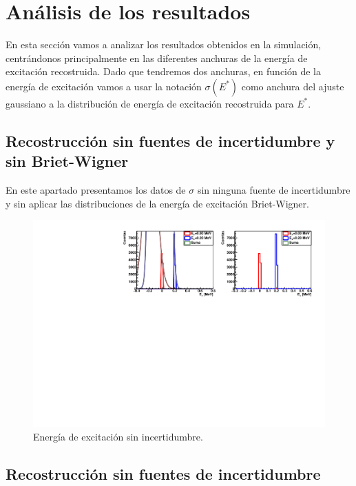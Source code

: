 \section{Análisis de los resultados}

En esta sección vamos a analizar los resultados obtenidos en la simulación, centrándonos principalmente en las diferentes anchuras de la energía de excitación recostruida. Dado que tendremos dos anchuras, en función de la energía de excitación vamos a usar la notación $\sigma(E^*)$ como anchura del ajuste gaussiano a la distribución de energía de excitación recostruida para $E^*$.  

\subsection{Recostrucción sin fuentes de incertidumbre y sin Briet-Wigner}

En este apartado presentamos los datos de $\sigma$ sin ninguna fuente de incertidumbre y sin aplicar las distribuciones de la energía de excitación Briet-Wigner.

\vspace*{-0.25cm}
\begin{figure}[H]
    \centering
    \includegraphics[width=1\textwidth]{Imagenes/Rec_incIdx4_single.pdf}
    \caption{Energía de excitación sin incertidumbre.}
    \label{Fig:05-RecExcIdx3}
\end{figure}


\subsection{Recostrucción sin fuentes de incertidumbre}

